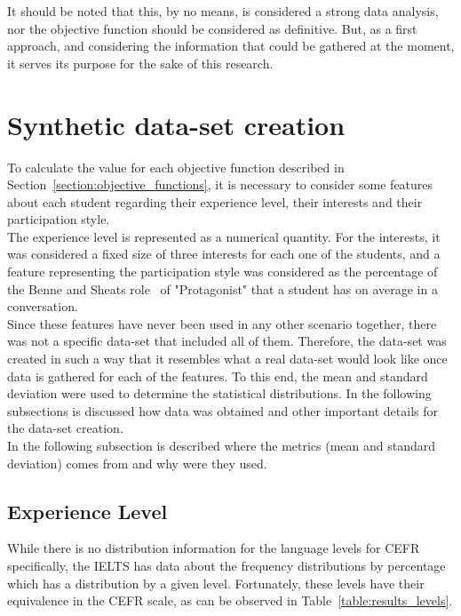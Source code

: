 It should be noted that this, by no means, is considered a strong data analysis, nor the objective function should be considered as definitive. But, as a first approach, and considering the information that could be gathered at the moment, it serves its purpose for the sake of this research.\\

\section{Synthetic data-set creation}
\label{section:synthetic_dataset}

To calculate the value for each objective function described in Section~\ref{section:objective_functions}, it is necessary to consider some features about each student regarding their experience level, their interests and their participation style.\\

The experience level is represented as a numerical quantity. For the interests, it was considered a fixed size of three interests for each one of the students, and a feature representing the participation style was considered as the percentage of the Benne and Sheats role~\cite{FunctionalRoles} of "Protagonist" that a student has on average in a conversation.\\

Since these features have never been used in any other scenario together, there was not a specific data-set that included all of them. Therefore, the data-set was created in such a way that it resembles what a real data-set would look like once data is gathered for each of the features. To this end, the mean and standard deviation were used to determine the statistical distributions. In the following subsections is discussed how data was obtained and other important details for the data-set creation.\\

In the following subsection is described where the metrics (mean and standard deviation) comes from and why were they used.\\

\subsection{Experience Level} 

While there is no distribution information for the language levels for CEFR specifically, the IELTS has data about the frequency distributions by percentage~\cite{ielts_demographic_data_2018} which has a distribution by a given level. Fortunately, these levels have their equivalence in the CEFR scale, as can be observed in Table~\ref{table:results_levels}.\\

